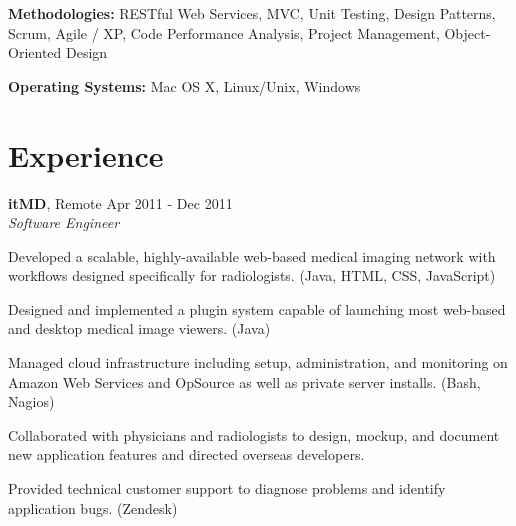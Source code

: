 \documentclass[margin,line]{resume}
\begin{document}
\begin{resume}
  \textbf{Methodologies:} RESTful Web Services, MVC, Unit Testing,
  Design Patterns, Scrum, Agile / XP, Code Performance Analysis,
  Project Management, Object-Oriented Design
	\vspace{-2mm}

  \textbf{Operating Systems:} Mac OS X, Linux/Unix, Windows



  \section{\mysidestyle \textcolor{mySideColor}{Experience}}

  \textbf{itMD}, Remote \hfill Apr 2011 - Dec 2011\vspace{1mm}\\
  \textsl{Software Engineer}\\
  \vspace{-3mm}
  \begin{list2}
  \item Developed a scalable, highly-available web-based medical
    imaging network with workflows designed specifically for
    radiologists. (Java, HTML, CSS, JavaScript)
  \item Designed and implemented a plugin system capable of launching
    most web-based and desktop medical image viewers. (Java)
  \item Managed cloud infrastructure including setup, administration,
    and monitoring on Amazon Web Services and OpSource as well as
    private server installs. (Bash, Nagios)
  \item Collaborated with physicians and radiologists to design,
    mockup, and document new application features and directed
    overseas developers.
  \item Provided technical customer support to diagnose problems and
    identify application bugs. (Zendesk)
  \end{list2}


\end{resume}
\end{document}
